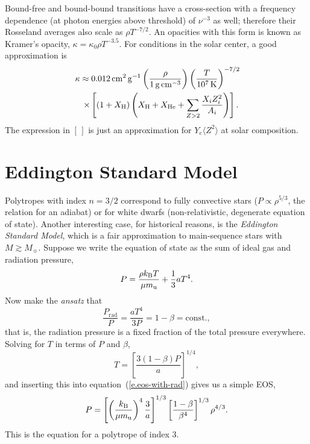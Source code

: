 Bound-free and bound-bound transitions have a cross-section with a frequency dependence (at photon energies above threshold) of $\nu^{-3}$ as well; therefore their Rosseland averages also scale as $\rho T^{-7/2}$.  An opacities with this form is known as {Kramer's opacity}, $\kappa = \kappa_{0}\rho T^{-3.5}$.  For conditions in the solar center, a good approximation is
\begin{eqnarray}
\lefteqn{\kappa \approx 0.012\nsp\cm^{2}\usp\gram^{-1}\left(\frac{\rho}{1\nsp\grampercc}\right) \left(\frac{T}{10^{7}\nsp\K}\right)^{-7/2}} \nonumber\\
&& \times\left[\left(1+X_{\mathrm{H}}\right)\left(X_{\mathrm{H}} + X_{\mathrm{He}} + \sum_{Z>2}\frac{X_{i}Z_{i}^{2}}{A_{i}}\right)\right].
\label{e.kramers-opacity}
\end{eqnarray}
The expression in $[\,]$ is just an approximation for $Y_{e}\langle Z^{2}\rangle$ at solar composition.

\section{Eddington Standard Model}\label{s.LE-Eddington-Standard-Model}

Polytropes with index $n=3/2$ correspond to fully convective stars ($P \propto \rho^{5/3}$, the relation for an adiabat) or for white dwarfs (non-relativistic, degenerate equation of state). Another interesting case, for historical reasons, is the \emph{Eddington Standard Model}, which is a fair approximation to main-sequence stars with $M \gtrsim M_{\sun}$.  Suppose we write the equation of state as the sum of ideal gas and radiation pressure,
\begin{equation}\label{e.eos-with-rad}
 P  = \frac{\rho k_\mathrm{B} T}{\mu m_\mathrm{u}} + \frac{1}{3}a T^{4}.
\end{equation}
Now make the \emph{ansatz} that
\begin{equation}\label{e.beta-def}
\frac{P_{\mathrm{rad}}}{P} = \frac{aT^{4}}{3P} = 1-\beta = \mathrm{const.},
\end{equation}
that is, the radiation pressure is a fixed fraction of the total pressure everywhere.
Solving for $T$ in terms of $P$ and $\beta$,
\[ T = \left[\frac{3(1-\beta) P}{a}\right]^{1/4}, \]
and inserting this into equation~(\ref{e.eos-with-rad}) gives us a simple EOS,
\begin{equation}\label{e.beta-eos}
P = \left[\left(\frac{k_\mathrm{B}}{\mu m_\mathrm{u}}\right)^{4}\frac{3}{a}\right]^{1/3}\left[\frac{1-\beta}{\beta^{4}}\right]^{1/3} \rho^{4/3}.
\end{equation}
This is the equation for a polytrope of index 3.

